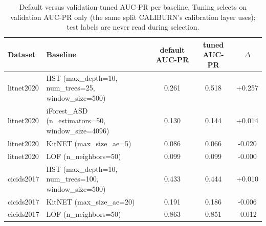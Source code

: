 \begin{table}[t]
\centering
\small
\begin{tabular}{llccc}
\toprule
Dataset & Baseline & default AUC-PR & tuned AUC-PR & $\Delta$ \\
\midrule
litnet2020 & HST (max_depth=10, num_trees=25, window_size=500) & 0.261 & 0.518 & +0.257 \\
litnet2020 & iForest\_ASD (n_estimators=50, window_size=4096) & 0.130 & 0.144 & +0.014 \\
litnet2020 & KitNET (max_size_ae=5) & 0.086 & 0.066 & -0.020 \\
litnet2020 & LOF (n_neighbors=50) & 0.099 & 0.099 & -0.000 \\
cicids2017 & HST (max_depth=10, num_trees=100, window_size=500) & 0.433 & 0.444 & +0.010 \\
cicids2017 & KitNET (max_size_ae=20) & 0.191 & 0.186 & -0.006 \\
cicids2017 & LOF (n_neighbors=50) & 0.863 & 0.851 & -0.012 \\
\bottomrule
\end{tabular}
\caption{Default versus validation-tuned AUC-PR per baseline. Tuning selects on validation AUC-PR only (the same split CALIBURN's calibration layer uses); test labels are never read during selection.}
\label{tab:tuning-delta}
\end{table}
